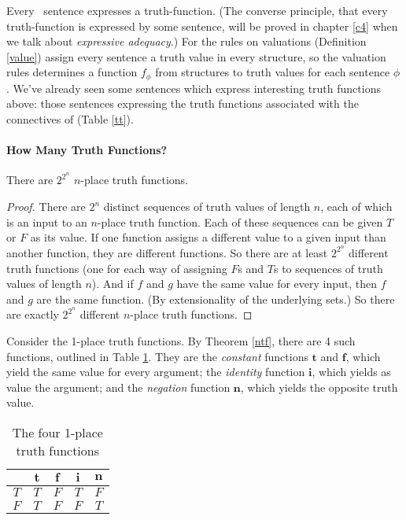 Every \lone\ sentence expresses a truth-function. (The converse principle, that every truth-function is expressed by some sentence, will be proved in chapter \ref{c4} when we talk about \emph{expressive adequacy}.) For the rules on valuations (Definition \ref{value}) assign every sentence a truth value in every structure, so the valuation rules determines a function $f_{\phi}$ from structures to truth values for each sentence $\phi$. We've already seen some sentences which express interesting truth functions above: those  sentences expressing the truth functions associated with the connectives of \lone (Table \ref{tt}). 

\paragraph{How Many Truth Functions?}
\begin{theorem}
	There are $2^{2^{n}}$ $n$-place truth functions.\label{ntf}
	\begin{proof}
		There are $2^{n}$ distinct sequences of truth values of length $n$, each of which is an input to an $n$-place truth function. Each of these sequences can be given $T$ or $F$ as its value. If one function assigns a different value to a given input than another function, they are different functions. So there are at least $2^{2^{n}}$ different truth functions (one for each way of assigning $F$s and $T$s to sequences of truth values of length $n$). And if $f$ and $g$ have the same value for every input, then $f$ and $g$ are the same function. (By extensionality of the underlying sets.) So there are exactly $2^{2^{n}}$ different $n$-place truth functions.
	\end{proof}
\end{theorem}
Consider the 1-place truth functions. By Theorem \ref{ntf}, there are 4 such functions, outlined in Table \ref{t1tf}. They are the \emph{constant} functions $\mathbf{t}$ and $\mathbf{f}$, which yield the same value for every argument; the \emph{identity} function $\mathbf{i}$, which yields as value the argument; and the \emph{negation} function $\mathbf{n}$, which yields the opposite truth value. 
\begin{table}[t]
	\centering
	\begin{tabular}{c|cccc}
		\toprule
		& $\mathbf{t}$ & $\mathbf{f}$ & $\mathbf{i}$ & $\mathbf{n}$ \\
		\midrule
		$T$ & $T$ & $F$ & $T$ & $F$ \\
		$F$ & $T$ & $F$ & $F$ & $T$ \\
		\bottomrule
	\end{tabular}
	\caption{The four 1-place truth functions\label{t1tf}}
\end{table}


